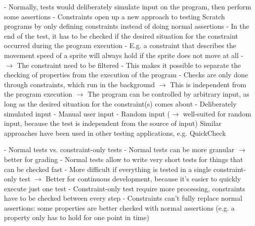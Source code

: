 - Normally, tests would deliberately simulate input on the program, then perform some assertions
- Constraints open up a new approach to testing Scratch programs by only defining constraints instead of doing normal assertions
- In the end of the test, it has to be checked if the desired situation for the constraint occurred during the program execution
    - E.g. a constraint that describes the movement speed of a sprite will always hold if the sprite does not move at all
    - $\rightarrow$ The constraint need to be filtered
- This makes it possible to separate the checking of properties from the execution of the program
    - Checks are only done through constraints, which run in the background
    $\rightarrow$ This is independent from the program execution
    $\rightarrow$ The program can be controlled by arbitrary input, as long as the desired situation for the constraint(s) comes about
        - Deliberately simulated input
        - Manual user input
        - Random input ($\rightarrow$ well-suited for random input, because the test is independent from the source of input)
          Similar approaches have been used in other testing applications, e.g. QuickCheck \cite{quickcheck}

- Normal tests vs. constraint-only tests
    - Normal tests can be more granular $\rightarrow$ better for grading
    - Normal tests allow to write very short tests for things that can be checked fast
        - More difficult if everything is tested in a single constraint-only test
        $\rightarrow$ Better for continuous development, because it's easier to quickly execute just one test
    - Constraint-only test require more processing, constraints have to be checked between every step
    - Constraints can't fully replace normal assertions: some properties are better checked with normal assertions (e.g. a property only has to hold for one point in time)

